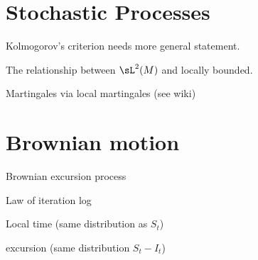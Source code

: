 \section{Stochastic Processes}
\ben
\item [(i)] Kolmogorov's criterion needs more general statement.
\item [(ii)] The relationship between $\sL^2(M)$ and locally bounded.
\item [(iii)] Martingales via local martingales (see wiki)
\een


\section{Brownian motion}

\ben
\item [(i)] Brownian excursion process
\item [(ii)] Law of iteration log
\item [(iii)] Local time (same distribution as $S_t$)
\item [(iv)] excursion (same distribution $S_t-I_t$)
\een



